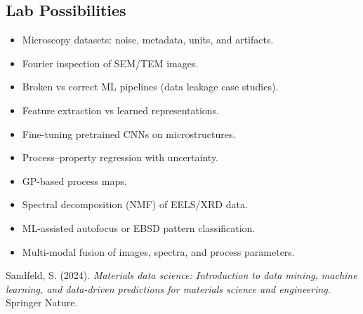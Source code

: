 \documentclass[
]{agujournal2019}
\newlength{\cslhangindent}
\newenvironment{CSLReferences}[2] %
 {\begin{list}{}{%
  \setlength{\itemindent}{0pt}
  \setlength{\leftmargin}{0pt}
  \setlength{\parsep}{0pt}
  \ifodd #1
   \setlength{\leftmargin}{\cslhangindent}
   \setlength{\itemindent}{-1\cslhangindent}
  \fi
  \setlength{\itemsep}{#2\baselineskip}}}
 {\end{list}}
\providecommand{\tightlist}{%
  \setlength{\itemsep}{0pt}\setlength{\parskip}{0pt}}
\begin{document}
\subsection{Lab Possibilities}\label{lab-possibilities}

\begin{itemize}
\tightlist
\item
  Microscopy datasets: noise, metadata, units, and artifacts.
\item
  Fourier inspection of SEM/TEM images.
\item
  Broken vs correct ML pipelines (data leakage case studies).
\item
  Feature extraction vs learned representations.
\item
  Fine-tuning pretrained CNNs on microstructures.
\item
  Process--property regression with uncertainty.
\item
  GP-based process maps.
\item
  Spectral decomposition (NMF) of EELS/XRD data.
\item
  ML-assisted autofocus or EBSD pattern classification.
\item
  Multi-modal fusion of images, spectra, and process parameters.
\end{itemize}

\protect{}\label{refs}
\begin{CSLReferences}{1}{0}
Sandfeld, S. (2024). \emph{Materials data science: Introduction to data
mining, machine learning, and data-driven predictions for materials
science and engineering}. Springer Nature.

\end{CSLReferences}
\end{document}
